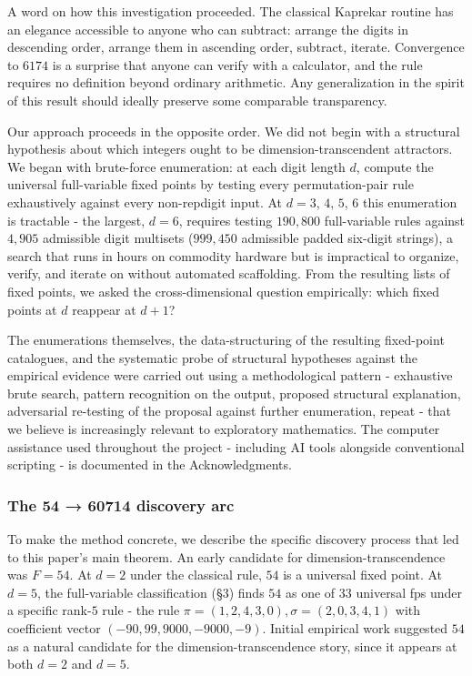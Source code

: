 \documentclass[11pt,letterpaper]{article}
\theoremstyle{paperstyle}
\theoremstyle{paperstyledef}
\theoremstyle{paperstylerem}
\begin{document}
A word on how this investigation proceeded. The classical Kaprekar
routine has an elegance accessible to anyone who can subtract: arrange
the digits in descending order, arrange them in ascending order,
subtract, iterate. Convergence to \(6174\) is a surprise that anyone can
verify with a calculator, and the rule requires no definition beyond
ordinary arithmetic. Any generalization in the spirit of this result
should ideally preserve some comparable transparency.

Our approach proceeds in the opposite order. We did not begin with a
structural hypothesis about which integers ought to be
dimension-transcendent attractors. We began with brute-force
enumeration: at each digit length \(d\), compute the universal
full-variable fixed points by testing every permutation-pair rule
exhaustively against every non-repdigit input. At \(d = 3\), \(4\),
\(5\), \(6\) this enumeration is tractable - the largest, \(d = 6\),
requires testing \(190{,}800\) full-variable rules against \(4{,}905\)
admissible digit multisets (\(999{,}450\) admissible padded six-digit
strings), a search that runs in hours on commodity hardware but is
impractical to organize, verify, and iterate on without automated
scaffolding. From the resulting lists of fixed points, we asked the
cross-dimensional question empirically: which fixed points at \(d\)
reappear at \(d + 1\)?

The enumerations themselves, the data-structuring of the resulting
fixed-point catalogues, and the systematic probe of structural
hypotheses against the empirical evidence were carried out using a
methodological pattern - exhaustive brute search, pattern recognition
on the output, proposed structural explanation, adversarial re-testing
of the proposal against further enumeration, repeat - that we believe
is increasingly relevant to exploratory mathematics. The computer
assistance used throughout the project - including AI tools alongside
conventional scripting - is documented in the Acknowledgments.

\hypertarget{the-54-60714-discovery-arc}{%
\subsubsection{The 54 → 60714 discovery arc}\label{the-54-60714-discovery-arc}}

To make the method concrete, we describe the specific discovery process
that led to this paper's main theorem. An early candidate for
dimension-transcendence was \(F = 54\). At \(d = 2\) under the classical
rule, \(54\) is a universal fixed point. At \(d = 5\), the full-variable
classification (§3) finds \(54\) as one of \(33\) universal fps under a
specific rank-\(5\) rule - the rule
\(\pi = (1, 2, 4, 3, 0), \sigma = (2, 0, 3, 4, 1)\) with coefficient
vector \((-90, 99, 9000, -9000, -9)\). Initial empirical work suggested
\(54\) as a natural candidate for the dimension-transcendence story,
since it appears at both \(d = 2\) and \(d = 5\).
\end{document}
